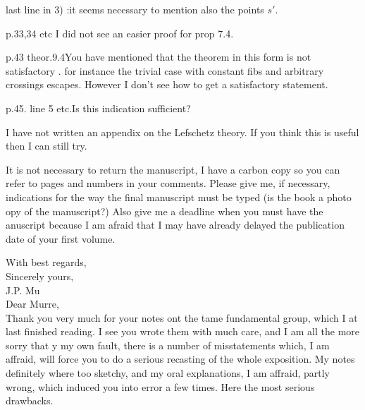 last line in 3) :\quad it seems necessary to mention also the points $s'$.

p.33,34 etc \quad I did not see an easier proof for prop 7.4.

p.43 theor.9.4\quad You have mentioned that the theorem in this form is not satisfactory . for instance the trivial case with constant fibs and arbitrary crossings escapes. However I don't see how to get a satisfactory statement.

p.45. line 5 etc.\quad Is this indication sufficient?

I have not written an appendix on the Lefschetz theory. If you think this is useful then I can still try.
\normalmarginpar

It is not necessary to return the manuscript, I have a carbon copy so you can refer to pages and numbers in your comments. Please give me, if necessary, indications for the way the final manuscript must be typed (is the book a  photo opy of the manuscript?) Also give me a deadline when you must have the anuscript because I am afraid that I may have already delayed the publication date of your first volume.

With best regards,\\
Sincerely yours,\\
J.P. Mu\\

Dear Murre,\\

Thank you very much for your notes ont the tame fundamental group, which I at last finished reading. I see you wrote them with much care, and I am all the more sorry that y my own fault, there is a number of misstatements which, I am affraid, will force you to do a serious recasting of the whole exposition. My notes definitely where too sketchy, and my oral explanations, I am affraid, partly wrong, which induced you into error a few times. Here the most serious drawbacks.

